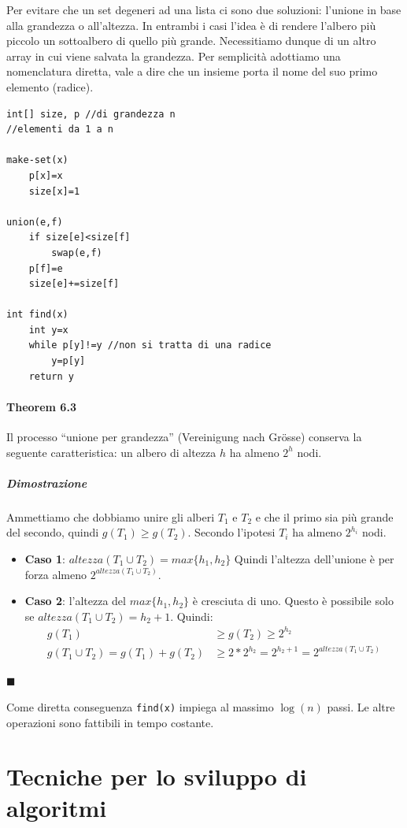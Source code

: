 \documentclass[a4paper]{book}
\newenvironment{mytheorem}[1]{\subsubsection*{Theorem #1}}{\begin{flushright}$\blacksquare$\end{flushright}}
\newcommand{\inline}[1]{\lstinline!#1!}%
\newcommand{\lstIndent}{4}
\begin{document}
Per evitare che un set degeneri ad una lista ci sono due soluzioni: l'unione in base alla grandezza o all'altezza. In entrambi i casi l'idea è di rendere l'albero più piccolo un sottoalbero di quello più grande. Necessitiamo dunque di un altro array in cui viene salvata la grandezza. Per semplicità adottiamo una nomenclatura diretta, vale a dire che un insieme porta il nome del suo primo elemento (radice).
\begin{lstlisting}[tabsize=\lstIndent]
int[] size, p //di grandezza n
//elementi da 1 a n

make-set(x)
	p[x]=x
	size[x]=1

union(e,f)
	if size[e]<size[f]
		swap(e,f)
	p[f]=e
	size[e]+=size[f]
	
int find(x)
	int y=x
	while p[y]!=y //non si tratta di una radice
		y=p[y]
	return y			
\end{lstlisting}
\begin{mytheorem}{6.3}
Il processo ``unione per grandezza'' (Vereinigung nach Grösse) conserva la seguente caratteristica: un albero di altezza $h$ ha almeno $2^h$ nodi.
\paragraph*{Dimostrazione}
Ammettiamo che dobbiamo unire gli alberi $T_1 \mbox{ e } T_2$ e che il primo sia più grande del secondo, quindi $g(T_1)\geq g(T_2)$. Secondo l'ipotesi $T_i \mbox{ ha almeno } 2^{h_i}$ nodi. 
\begin{itemize}
\item \textbf{Caso 1}: $altezza(T_1 \cup T_2)=max\{h_1,h_2\}$
Quindi l'altezza dell'unione è per forza almeno $2^{altezza(T_1 \cup T_2)}$.
\item \textbf{Caso 2}: l'altezza del $max\{h_1,h_2\}$ è cresciuta di uno. Questo è possibile solo se $altezza(T_1 \cup T_2)=h_2+1$. Quindi:
\begin{align*}
g(T_1)&\geq g(T_2) \geq 2^{h_2} \\
g(T_1 \cup T_2)=g(T_1)+g(T_2) &\geq 2*2^{h_2}=2^{h_2+1}=2^{altezza(T_1 \cup T_2)}
\end{align*}
\end{itemize}
\end{mytheorem}
Come diretta conseguenza \inline{find(x)} impiega al massimo $\log(n)$ passi. Le altre operazioni sono fattibili in tempo costante.

\chapter{Tecniche per lo sviluppo di algoritmi}
\end{document}
